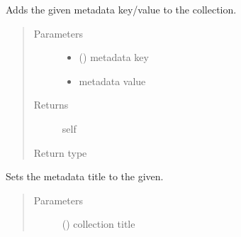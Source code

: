 \documentclass[letterpaper,10pt,english]{sphinxmanual}
\begin{document}
\begin{fulllineitems}
\begin{fulllineitems}
\label{\detokenize{autoapi/pine/client/index:pine.client.CollectionBuilder.metadata}}
Adds the given metadata key/value to the collection.
\begin{quote}\begin{description}
\item[{Parameters}] \leavevmode\begin{itemize}
\item {} 
 () \textendash{} metadata key

\item {} 
 \textendash{} metadata value

\end{itemize}

\item[{Returns}] \leavevmode
self

\item[{Return type}] \leavevmode
{\hyperref[\detokenize{autoapi/pine/client/models/index:pine.client.models.CollectionBuilder}]{}}

\end{description}\end{quote}

\end{fulllineitems}


\begin{fulllineitems}
\label{\detokenize{autoapi/pine/client/index:pine.client.CollectionBuilder.title}}
Sets the metadata title to the given.
\begin{quote}\begin{description}
\item[{Parameters}] \leavevmode
{} () \textendash{} collection title


\end{description}
\end{quote}
\end{fulllineitems}
\end{fulllineitems}
\end{document}
